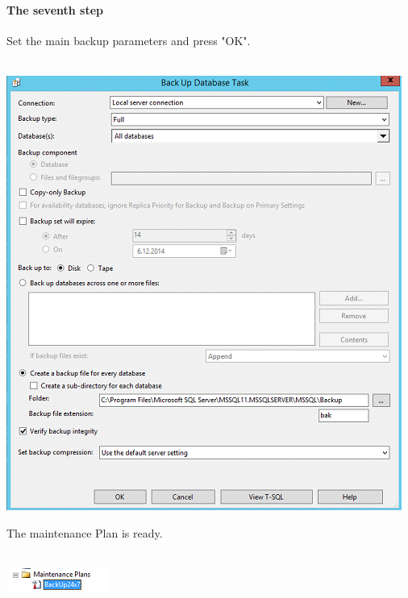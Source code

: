 \documentclass[english]{article}
\begin{document}
\paragraph{The seventh step} Set the main backup parameters and press "OK".\\\\
\centerline{\includegraphics[scale=0.8]{administration/18}}
The maintenance Plan is ready.\\\\
\centerline{\includegraphics[scale=1]{administration/19}}
\end{document}
